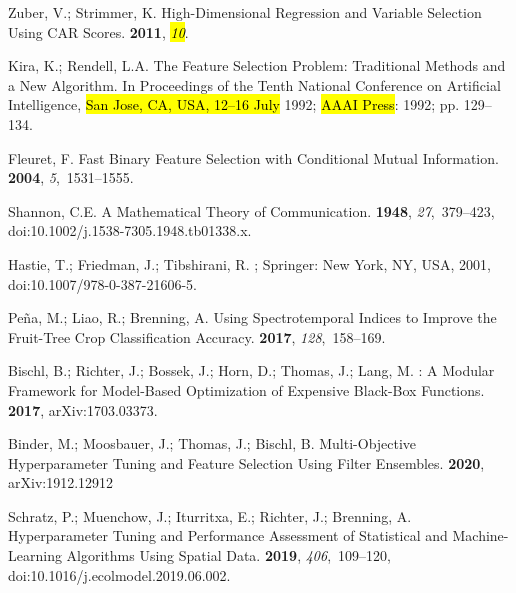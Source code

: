 \documentclass[remotesensing,article,accept,moreauthors,pdftex]{Definitions/mdpi}
\begin{document}
\begin{thebibliography}{999}
Zuber, V.; Strimmer, K.
\newblock High-{{Dimensional Regression}} and {{Variable Selection Using CAR
  Scores}}.
 {\bf
  2011}, {\em \hl{10}}. %


Kira, K.; Rendell, L.A.
\newblock The Feature Selection Problem: Traditional Methods and a New
  Algorithm.
\newblock  In Proceedings of the Tenth National Conference on {{Artificial}}
  Intelligence, \hl{San Jose, CA, USA, 12--16 July} 1992; {\hl{AAAI Press}}:  1992; pp. 129--134.

Fleuret, F.
\newblock Fast {{Binary Feature Selection}} with {{Conditional Mutual
  Information}}.
 {\bf 2004}, {\em
  5},~1531--1555.

Shannon, C.E.
\newblock A Mathematical Theory of Communication.
 {\bf 1948}, {\em
  27},~379--423, doi:10.1002/j.1538-7305.1948.tb01338.x.

Hastie, T.; Friedman, J.; Tibshirani, R.
; {Springer}: New York, NY, USA,
  2001, doi:10.1007/978-0-387-21606-5.

Pe{\~n}a, M.; Liao, R.; Brenning, A.
\newblock Using Spectrotemporal Indices to Improve the Fruit-Tree Crop
  Classification Accuracy.
 {\bf 2017},
  {\em 128},~158--169.

Bischl, B.; Richter, J.; Bossek, J.; Horn, D.; Thomas, J.; Lang, M.
: A {{Modular Framework}} for {{Model}}-{{Based
  Optimization}} of {{Expensive Black}}-{{Box Functions}}.
 {\bf 2017}, arXiv:1703.03373.


Binder, M.; Moosbauer, J.; Thomas, J.; Bischl, B.
\newblock Multi-{{Objective Hyperparameter Tuning}} and {{Feature Selection}}
  Using {{Filter Ensembles}}.
 {\bf 2020},
  arXiv:1912.12912

Schratz, P.; Muenchow, J.; Iturritxa, E.; Richter, J.; Brenning, A.
\newblock Hyperparameter Tuning and Performance Assessment of Statistical and
  Machine-Learning Algorithms Using Spatial Data.
 {\bf 2019}, {\em 406},~109--120, doi:10.1016/j.ecolmodel.2019.06.002.


\end{thebibliography}
\end{document}
